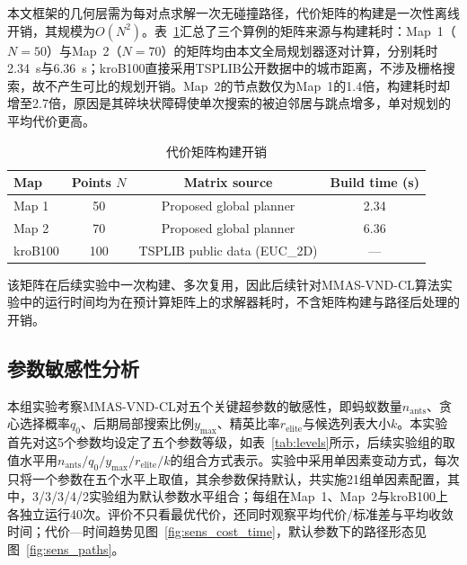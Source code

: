 \documentclass[lettersize,journal]{IEEEtran}
\begin{document}
本文框架的几何层需为每对点求解一次无碰撞路径，代价矩阵的构建是一次性离线开销，其规模为$O(N^2)$。表~\textcolor{blue}{\ref{tab:matrix_cost}}汇总了三个算例的矩阵来源与构建耗时：Map~1（$N=50$）与Map~2（$N=70$）的矩阵均由本文全局规划器逐对计算，分别耗时2.34~s与6.36~s；kroB100直接采用TSPLIB公开数据中的城市距离，不涉及栅格搜索，故不产生可比的规划开销。Map~2的节点数仅为Map~1的1.4倍，构建耗时却增至2.7倍，原因是其碎块状障碍使单次搜索的被迫邻居与跳点增多，单对规划的平均代价更高。

\begin{table}[htbp]
\caption{代价矩阵构建开销}
\label{tab:matrix_cost}
\centering
\footnotesize
\begin{tabular}{lccc}
\toprule
Map & Points $N$ & Matrix source & Build time (s) \\
\midrule
Map 1 & 50 & Proposed global planner & 2.34 \\
Map 2 & 70 & Proposed global planner & 6.36 \\
kroB100 & 100 & TSPLIB public data (EUC\_2D) & --- \\
\bottomrule
\end{tabular}
\end{table}

该矩阵在后续实验中一次构建、多次复用，因此后续针对MMAS-VND-CL算法实验中的运行时间均为在预计算矩阵上的求解器耗时，不含矩阵构建与路径后处理的开销。

\subsection{参数敏感性分析}
\label{subsec:exp_sens}

本组实验考察MMAS-VND-CL对五个关键超参数的敏感性，即蚂蚁数量$n_{\mathrm{ants}}$、贪心选择概率$q_0$、后期局部搜索比例$y_{\max}$、精英比率$r_{\mathrm{elite}}$与候选列表大小$k$。本实验首先对这5个参数均设定了五个参数等级，如表~\textcolor{blue}{\ref{tab:levels}}所示，后续实验组的取值水平用$n_{\mathrm{ants}}/q_0/y_{\max}/r_{\mathrm{elite}}/k$的组合方式表示。实验中采用单因素变动方式，每次只将一个参数在五个水平上取值，其余参数保持默认，共实施21组单因素配置，其中，3/3/3/4/2实验组为默认参数水平组合；每组在Map~1、Map~2与kroB100上各独立运行40次。评价不只看最优代价，还同时观察平均代价/标准差与平均收敛时间；代价—时间趋势见图~\textcolor{blue}{\ref{fig:sens_cost_time}}，默认参数下的路径形态见图~\textcolor{blue}{\ref{fig:sens_paths}}。
\end{document}

